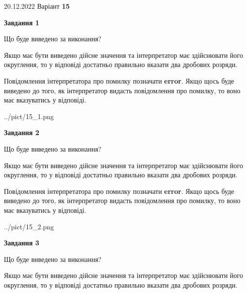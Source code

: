 \documentclass[12pt, ukrainian]{article}
\begin{document}
{20.12.2022 Варіант \No \textbf { 15 }\par}
{
\begin {Large}

{\begin {center}\textbf{Завдання 1}\end {center}}\par
Що буде виведено за виконання? \par

Якщо має бути виведено дійсне значення та інтерпретатор має здійснювати його округлення, 
то у відповіді достатньо правильно вказати два дробових розряди.

Повідомлення інтерпретатора про помилку позначати \textbf{error}.
Якщо щось буде виведено до того, як інтерпретатор видасть повідомлення про помилку, 
то воно має вказуватись у відповіді. \par

\begin{center}
	{../pict/15_1.png}
\end{center}
\newpage

{\begin {center}\textbf{Завдання 2}\end {center}}\par
Що буде виведено за виконання? \par

Якщо має бути виведено дійсне значення та інтерпретатор має здійснювати його округлення, 
то у відповіді достатньо правильно вказати два дробових розряди.

Повідомлення інтерпретатора про помилку позначати \textbf{error}.
Якщо щось буде виведено до того, як інтерпретатор видасть повідомлення про помилку, 
то воно має вказуватись у відповіді. \par

\begin{center}
	{../pict/15_2.png}
\end{center}
\newpage

{\begin {center}\textbf{Завдання 3}\end {center}}\par
Що буде виведено за виконання? \par

Якщо має бути виведено дійсне значення та інтерпретатор має здійснювати його округлення, 
то у відповіді достатньо правильно вказати два дробових розряди.


\end{Large}}
\end{document}
